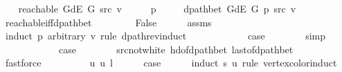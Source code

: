 \begin{isabellebody}
%
\isatagproof
{}\isamarkupfalse%
\isanewline
\ \ \isamarkupfalse%
\ {\isachardoublequoteopen}reachable\ {\isacharparenleft}{\kern0pt}G{\isachardot}{\kern0pt}dE\ G{\isacharparenright}{\kern0pt}\ src\ v{\isachardoublequoteclose}\isanewline
\ \ \isamarkupfalse%
\ \isamarkupfalse%
\ p\ \isanewline
\ \ \ \ {\isachardoublequoteopen}dpath{\isacharunderscore}{\kern0pt}bet\ {\isacharparenleft}{\kern0pt}G{\isachardot}{\kern0pt}dE\ G{\isacharparenright}{\kern0pt}\ p\ src\ v{\isachardoublequoteclose}\isanewline
\ \ \ \ \isamarkupfalse%
\ reachable{\isacharunderscore}{\kern0pt}iff{\isacharunderscore}{\kern0pt}dpath{\isacharunderscore}{\kern0pt}bet\isanewline
\ \ \ \ \isacommand{{\isachardot}{\kern0pt}{\isachardot}{\kern0pt}}\isamarkupfalse%
\isanewline
\ \ \isamarkupfalse%
\ False\isanewline
\ \ \ \ \isamarkupfalse%
\ assms\isanewline
\ \ \isamarkupfalse%
\ {\isacharparenleft}{\kern0pt}induct\ p\ arbitrary{\isacharcolon}{\kern0pt}\ v\ rule{\isacharcolon}{\kern0pt}\ dpath{\isacharunderscore}{\kern0pt}rev{\isacharunderscore}{\kern0pt}induct{\isacharparenright}{\kern0pt}\isanewline
\ \ \ \ \isamarkupfalse%
\ {}\isanewline
\ \ \ \ \isamarkupfalse%
\ {\isacharquery}{\kern0pt}case\isanewline
\ \ \ \ \ \ \isamarkupfalse%
\ simp\isanewline
\ \ \isamarkupfalse%
\isanewline
\ \ \ \ \isamarkupfalse%
\ {}\isanewline
\ \ \ \ \isamarkupfalse%
\ {\isacharquery}{\kern0pt}case\isanewline
\ \ \ \ \ \ \isamarkupfalse%
\ src{\isacharunderscore}{\kern0pt}not{\isacharunderscore}{\kern0pt}white\ hd{\isacharunderscore}{\kern0pt}of{\isacharunderscore}{\kern0pt}dpath{\isacharunderscore}{\kern0pt}bet{\isacharprime}{\kern0pt}\ last{\isacharunderscore}{\kern0pt}of{\isacharunderscore}{\kern0pt}dpath{\isacharunderscore}{\kern0pt}bet\isanewline
\ \ \ \ \ \ \isamarkupfalse%
\ fastforce\isanewline
\ \ \isamarkupfalse%
\isanewline
\ \ \ \ \isamarkupfalse%
\ {\isacharparenleft}{\kern0pt}{}\ u\ u{\isacharprime}{\kern0pt}\ l{\isacharparenright}{\kern0pt}\isanewline
\ \ \ \ \isamarkupfalse%
\ {\isacharquery}{\kern0pt}case\isanewline
\ \ \ \ \isamarkupfalse%
\ {\isacharparenleft}{\kern0pt}induct\ s\ u\ rule{\isacharcolon}{\kern0pt}\ vertex{\isacharunderscore}{\kern0pt}color{\isacharunderscore}{\kern0pt}induct{\isacharparenright}{\kern0pt}\isanewline

\end{isabellebody}
